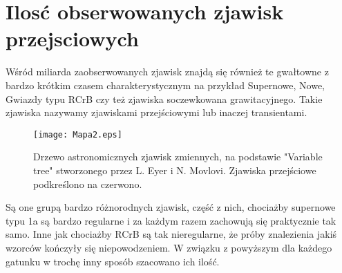\documentclass[polish,12pt]{pracamgr}
\begin{document}
\chapter{Ilosć obserwowanych zjawisk przejsciowych}
Wśród miliarda zaobserwowanych zjawisk znajdą się również te gwałtowne z bardzo krótkim czasem charakterystycznym na przykład Supernowe, Nowe, Gwiazdy typu RCrB czy też zjawiska soczewkowana grawitacyjnego. Takie zjawiska nazywamy zjawiskami przejściowymi lub inaczej transientami.
\begin{figure}[h]
\centering
\texttt{[image: Mapa2.eps]}
\caption{Drzewo astronomicznych zjawisk zmiennych, na podstawie "Variable tree" stworzonego przez L. Eyer i N. Movlovi. Zjawiska przejściowe podkreślono na czerwono.}
\label{Rys 2}
\end{figure}
Są one grupą bardzo różnorodnych zjawisk, część z nich, chociażby supernowe typu 1a są bardzo regularne i za każdym razem zachowują się praktycznie tak samo. Inne jak chociażby RCrB są tak nieregularne, że próby znalezienia jakiś wzorców kończyły się niepowodzeniem. W związku z powyższym dla każdego gatunku w trochę inny sposób szacowano ich ilość.
\end{document}
